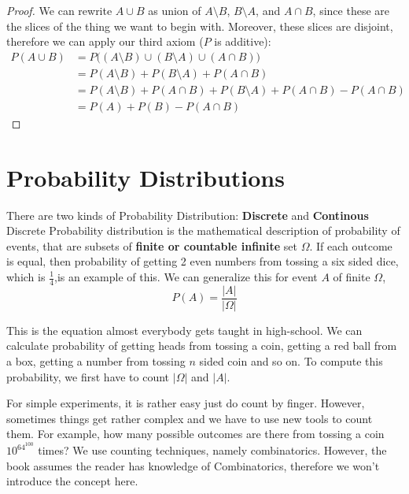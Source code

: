 \begin{proof}
    We can rewrite $A \cup B$ as union of $A \setminus B$, $B \setminus A$, and $A \cap B$, since these are the slices of the thing we want to begin with. Moreover, these slices are disjoint, therefore we can apply our third axiom ($P$ is additive):
$$ 
\begin{aligned} 
    P \left(A \cup B\right) &= P \bigl( (A \setminus B) \cup (B \setminus A) \cup (A \cap B) \bigr) \\
                            &= P(A \setminus B) + P( B \setminus A) + P(A \cap B)  \\
                            &= P(A \setminus B) + P( A \cap B)+ P( B \setminus A) + P(A \cap B) - P(A \cap B)  \\
                            &= P(A)+P(B)-P(A \cap B) 
\end{aligned}
$$ 
\end{proof}



\section{Probability Distributions}
There are two kinds of Probability Distribution: \textbf{Discrete} and \textbf{Continous}
Discrete Probability distribution is the mathematical  description of probability of events, that are subsets of \textbf{finite or countable infinite} set $\Omega$. 
If each outcome is equal, then probability of getting 2 even numbers from tossing a six sided dice, which is $\frac{1}{4}$,is an example of this. We can generalize this for event $A$ of finite $\Omega$,
$$ P(A) = \frac{|A|}{|\Omega |}$$

This is the equation almost everybody gets taught in high-school. We can calculate probability of getting heads from tossing a coin, getting a red ball from a box, getting a number from tossing $n$ sided coin and so on.
To compute this probability, we first have to count $ | \Omega | $ and $|A |$. 

For simple experiments, it is rather easy just do count by finger.
However, sometimes things get rather complex and we have to use new tools to count them. For example, how many possible outcomes are there from tossing a coin $10^{64^{100}}$ times? We use counting techniques, namely combinatorics. However, the book assumes the reader has knowledge of Combinatorics, therefore we won't introduce the concept here.

